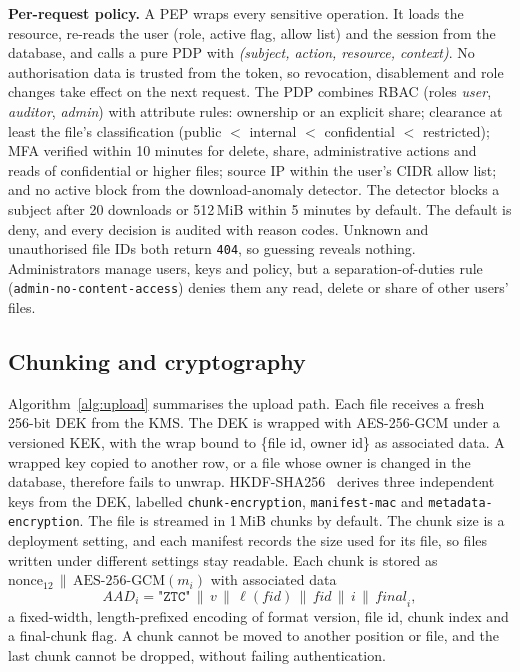 \documentclass[conference]{IEEEtran}
\newcommand{\code}[1]{\texttt{\small #1}}
\begin{document}
\textbf{Per-request policy.} A PEP wraps every sensitive operation. It loads the resource, re-reads the user (role, active flag, allow list) and the session from the database, and calls a pure PDP with \emph{(subject, action, resource, context)}. No authorisation data is trusted from the token, so revocation, disablement and role changes take effect on the next request. The PDP combines RBAC (roles \emph{user}, \emph{auditor}, \emph{admin}) with attribute rules: ownership or an explicit share; clearance at least the file's classification (public $<$ internal $<$ confidential $<$ restricted); MFA verified within 10 minutes for delete, share, administrative actions and reads of confidential or higher files; source IP within the user's CIDR allow list; and no active block from the download-anomaly detector. The detector blocks a subject after 20 downloads or 512\,MiB within 5 minutes by default. The default is deny, and every decision is audited with reason codes. Unknown and unauthorised file IDs both return \code{404}, so guessing reveals nothing. Administrators manage users, keys and policy, but a separation-of-duties rule (\code{admin-no-content-access}) denies them any read, delete or share of other users' files.

\subsection{Chunking and cryptography}
Algorithm~\ref{alg:upload} summarises the upload path. Each file receives a fresh 256-bit DEK from the KMS. The DEK is wrapped with AES-256-GCM under a versioned KEK, with the wrap bound to \{file id, owner id\} as associated data. A wrapped key copied to another row, or a file whose owner is changed in the database, therefore fails to unwrap. HKDF-SHA256~\cite{rfc5869} derives three independent keys from the DEK, labelled \code{chunk-encryption}, \code{manifest-mac} and \code{metadata-encryption}. The file is streamed in 1\,MiB chunks by default. The chunk size is a deployment setting, and each manifest records the size used for its file, so files written under different settings stay readable. Each chunk is stored as $\text{nonce}_{12}\,\|\,\text{AES-256-GCM}(m_i)$ with associated data
\begin{equation}
\mathit{AAD}_i = \texttt{"ZTC"}\,\|\,v\,\|\,\ell(\mathit{fid})\,\|\,\mathit{fid}\,\|\,i\,\|\,\mathit{final}_i ,
\end{equation}
a fixed-width, length-prefixed encoding of format version, file id, chunk index and a final-chunk flag. A chunk cannot be moved to another position or file, and the last chunk cannot be dropped, without failing authentication.
\end{document}
